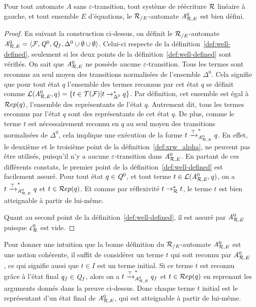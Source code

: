 \begin{theorem}
  Pour tout automate $A$ sans $\varepsilon$-transition, tout système de réécriture $\mathcal R$
  linéaire à gauche, et tout ensemble $E$ d'équations, le ${\mathcal R_{/E}}$-automate ${\mathit A}_{\mathcal R,E}^0$ est bien défini.
\end{theorem}

\begin{proof}
  En suivant la construction ci-dessus, on définit le ${\mathcal R_{/E}}$-automate
  ${\mathit A}_{\mathcal R,E}^0 = \langle \mathcal{F}, \mathit Q^0, \mathit Q_f, \Delta^0 \cup \emptyset \cup \emptyset\rangle$.
  Celui-ci respecte de la définition~\ref{def:well-defined}, seulement si les deux points
  de la définition~\ref{def:well-defined} sont vérifiés.
  \noindent
  On sait que ${\mathit A}_{\mathcal R,E}^0$ ne possède aucune $\varepsilon$-transition.
  Tous les termes sont reconnus au seul moyen des transitions normalisées de l'ensemble $\Delta^0$.
  Cela signifie que pour tout état $q$ l'ensemble des termes reconnus par cet état $q$ 
  se définit comme $\mathcal{L}({\mathit A}_{\mathcal R,E}^0, q) = \{ t \in \mathcal{T(F)} | t \rightarrow_{\Delta^0}^* q\}$. Par définition,
  cet ensemble est égal à $\mathcal R ep(q)$, l'ensemble des représentants de l'état $q$. Autrement dit,
  tous les termes reconnus par l'état $q$ sont des représentants de cet état $q$.
  De plus, comme le terme $t$ est nécessairement reconnu en $q$ au seul moyen des transitions normalisées de $\Delta^0$,
  cela implique une exécution de la forme $t \xrightarrow{\top}_{{\mathit A}_{\mathcal R,E}^0}^* q$. En effet, le deuxième et le troisième point de la
  définition~\ref{def:xrw_alpha}, ne peuvent pas être utilisés, puisqu'il
  n'y a aucune $\varepsilon$-transition dans ${\mathit A}_{\mathcal R,E}^0$.
  En partant de ces différents constats, le premier point de la définition~\ref{def:well-defined} est facilement assuré.
  Pour tout état $q \in \mathit Q^0$, et tout terme $t \in \mathcal{L}({\mathit A}_{\mathcal R,E}^0, q)$, on a $t \xrightarrow{\top}_{{\mathit A}_{\mathcal R,E}^0}^* q$ et $t \in \mathcal R ep(q)$. 
  Et comme par réflexivité $t \rightarrow_\mathcal R^* t$, le terme $t$ est bien atteignable à partir de lui-même.
  
  Quant au second point de la définition~\ref{def:well-defined}, il est assuré par ${\mathit A}_{\mathcal R,E}^0$ puisque $\upvarepsilon_{\mathcal R}^0$ est vide.
\end{proof}

Pour donner une intuition que la bonne définition du ${\mathcal R_{/E}}$-automate ${\mathit A}_{\mathcal R,E}^0$ est une notion cohérente, il 
suffit de considérer un terme $t$ qui soit reconnu par ${\mathit A}_{\mathcal R,E}^0$, ce qui signifie aussi que $t \in I$
est un terme initial. Si ce terme $t$ est reconnu grâce à l'état final $q_f \in \mathit Q_f$,
alors on a $t \xrightarrow{\top}_{{\mathit A}_{\mathcal R,E}^0}^* q_f$ et $t \in \mathcal R ep(q)$ en reprenant les arguments donnés dans la preuve ci-dessus.
Donc chaque terme $t$ initial est le représentant d'un état final de ${\mathit A}_{\mathcal R,E}^0$, qui est atteignable à partir de 
lui-même.

